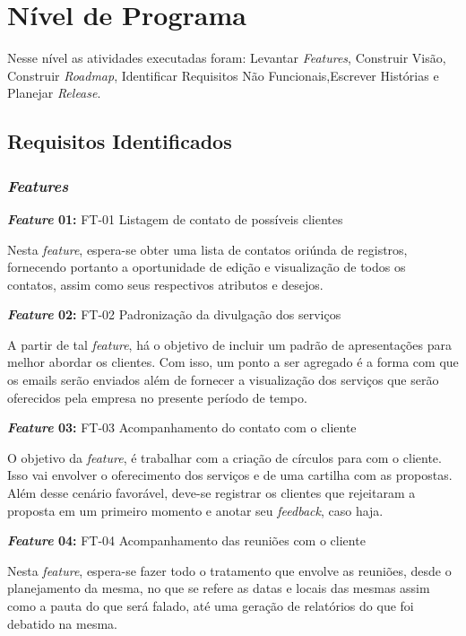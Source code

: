 \chapter[Nível de Programa]{Nível de Programa}
Nesse nível as atividades executadas foram: Levantar \textit{Features},
Construir Visão, Construir \textit{Roadmap}, Identificar Requisitos Não Funcionais,Escrever
Histórias e Planejar \textit{Release}. 

\section{Requisitos Identificados}

\subsection{\textit{Features}}
\textbf{\textit{Feature} 01:} FT-01 Listagem de contato de possíveis clientes

Nesta \textit{feature}, espera-se obter uma lista de contatos oriúnda de registros, fornecendo portanto a oportunidade de edição e visualização de todos os contatos, assim como seus respectivos atributos e desejos.


\textbf{\textit{Feature} 02:} FT-02 Padronização da divulgação dos serviços

A partir de tal \textit{feature}, há o objetivo de incluir um padrão de apresentações para melhor abordar os clientes. Com isso, um ponto a ser agregado é a forma com que os emails serão enviados além de fornecer a visualização dos serviços que serão oferecidos pela empresa no presente período de tempo.


\textbf{\textit{Feature} 03:} FT-03 Acompanhamento do contato com o cliente

O objetivo da \textit{feature}, é trabalhar com a criação de círculos para com o cliente. Isso vai envolver o oferecimento dos serviços e de uma cartilha com as propostas. Além desse cenário favorável, deve-se registrar os clientes que rejeitaram a proposta em um primeiro momento e anotar seu \textit{feedback}, caso haja.


\textbf{\textit{Feature} 04:} FT-04 Acompanhamento das reuniões com o cliente

Nesta \textit{feature}, espera-se fazer todo o tratamento que envolve as reuniões, desde o planejamento da mesma, no que se refere as datas e locais das mesmas assim como a pauta do que será falado, até uma geração de relatórios do que foi debatido na mesma.		


